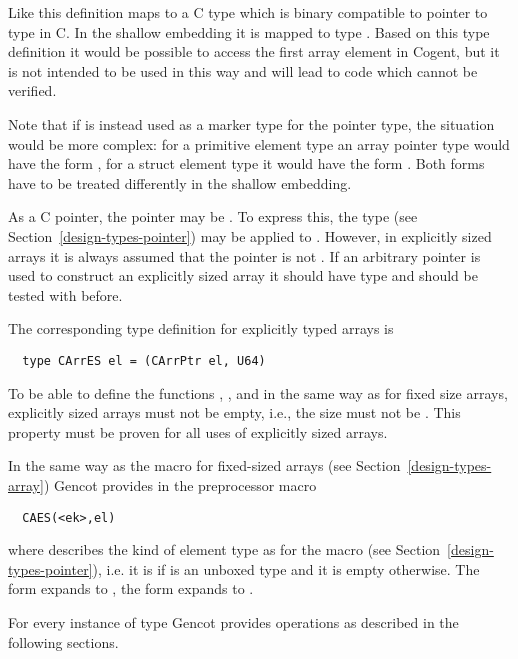 Like  this definition maps to a C type which is binary compatible to pointer to type  in C. In the 
shallow embedding it is mapped to type . Based on this type definition it would be possible to access the 
first array element in Cogent, but it is not intended to be used in this way and will lead to code which cannot be verified.

Note that if  is instead used as a marker type for the pointer type, the situation would 
be more complex: for a primitive element type an array pointer type would have the form ,
for a struct element type  it would have the form . Both forms have to be treated 
differently in the shallow embedding.

As a C pointer, the pointer may be . To express this, the type  (see Section~\ref{design-types-pointer})
may be applied to . However, in explicitly sized arrays it is always assumed that the pointer is not .
If an arbitrary pointer is used to construct an explicitly sized array it should have type  and should
be tested with  before.

The corresponding type definition for explicitly typed arrays is
\begin{verbatim}
  type CArrES el = (CArrPtr el, U64)
\end{verbatim}

To be able to define the functions , , and  in the same way as for fixed size
arrays, explicitly sized arrays must not be empty, i.e., the size must not be . This property must be proven for 
all uses of explicitly sized arrays.

In the same way as the macro  for fixed-sized arrays (see Section~\ref{design-types-array}) Gencot provides in 
 the preprocessor macro
\begin{verbatim}
  CAES(<ek>,el)
\end{verbatim}
where  describes the kind of element type as for the macro  (see Section~\ref{design-types-pointer}),
i.e. it is  if  is an unboxed type and it is empty otherwise. The form  expands to
, the form  expands to .

For every instance of type  Gencot provides operations as described in the following sections.

